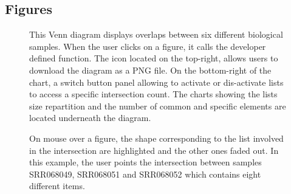 \documentclass{bmcart}
\begin{document}
\begin{backmatter}


\section*{Figures}
  \begin{figure}[h!]
  \caption{
      This Venn diagram displays overlaps between six different biological
      samples. When the user clicks on a figure, it calls the developer defined
      function. The icon located on the top-right, allows users to download the
      diagram as a PNG file. On the bottom-right of the chart, a switch button
      panel allowing to activate or dis-activate lists to access a specific
      intersection count. The charts showing the lists size repartition and the
      number of common and specific elements are located underneath the
      diagram.}
      \end{figure}

\begin{figure}[h!]
  \caption{
      On mouse over a figure, the shape corresponding to the list involved in
      the intersection are highlighted and the other ones faded out. In
      this example, the user points the intersection between samples SRR068049,
      SRR068051 and SRR068052 which contains eight different items.}
      \end{figure}



\end{backmatter}
\end{document}

